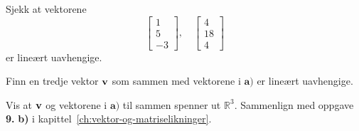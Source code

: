 




\begin{oppgave}

\begin{punkt}
Sjekk at vektorene $$\begin{bmatrix}
1\\
5\\
-3
\end{bmatrix}, \quad \begin{bmatrix}
4\\
18\\
4
\end{bmatrix}$$ er lineært uavhengige.
\end{punkt}

\begin{punkt}
Finn en tredje vektor $\mathbf{v}$ som sammen med vektorene i $\textbf{a)}$ er lineært uavhengige.
\end{punkt}


\begin{punkt}
Vis at $\mathbf{v}$ og vektorene i $\textbf{a)}$ til sammen spenner ut
$\mathbb{R}^3$. Sammenlign med oppgave \textbf{9.} \textbf{b)} i
kapittel~\ref{ch:vektor-og-matriselikninger}.
\end{punkt}

\end{oppgave}

